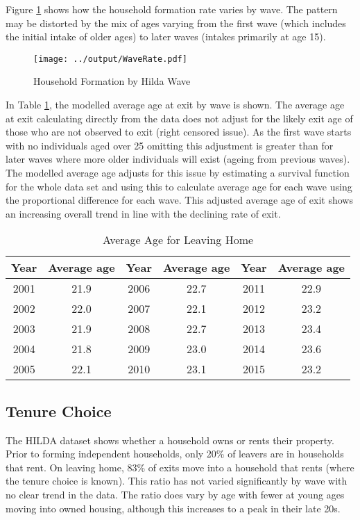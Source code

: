 \documentclass[12pt]{article}
\begin{document}
Figure \ref{ExitbyWave} shows how the household formation rate varies by wave. The pattern may be distorted by the mix of ages varying from the first wave (which includes the initial intake of older ages) to later waves (intakes primarily at age 15).

\begin{figure}[htpb]
  \caption{Household Formation by Hilda Wave}
  \label{ExitbyWave}
  \centering
  \texttt{[image: ../output/WaveRate.pdf]}
\end{figure}

In Table \ref{rate1}, the modelled average age at exit by wave is shown. The average age at exit calculating directly from the data does not adjust for the likely exit age of those who are not observed to exit (right censored issue). As the first wave starts with no individuals aged over 25 omitting this adjustment is greater than for later waves where more older individuals will exist (ageing from previous waves). The modelled average age adjusts for this issue by estimating a survival function for the whole data set and using this to calculate average age for each wave using the proportional difference for each wave. This adjusted average age of exit shows an increasing overall trend in line with the declining rate of exit.

\begin{table}[htpb]
  \centering
  \caption{Average Age for Leaving Home}
  \label{rate1}
\begin{tabular}{@{}cccccc@{}}
\toprule
Year & Average age & Year & Average age & Year & Average age\tabularnewline
\midrule
2001 & 21.9 & 2006 & 22.7 & 2011 & 22.9 \tabularnewline
2002 & 22.0 & 2007 & 22.1 & 2012 & 23.2 \tabularnewline
2003 & 21.9 & 2008 & 22.7 & 2013 & 23.4 \tabularnewline
2004 & 21.8 & 2009 & 23.0 & 2014 & 23.6 \tabularnewline
2005 & 22.1 & 2010 & 23.1 & 2015 & 23.2 \tabularnewline
\bottomrule
\end{tabular}
\end{table}


\subsection{Tenure Choice}
The HILDA dataset shows whether a household owns or rents their property. Prior to forming independent households, only 20\% of leavers are in households that rent.  On leaving home, 83\% of exits move into a household that rents (where the tenure choice is known). This ratio has not varied significantly by wave with no clear trend in the data. The ratio does vary by age with fewer at young ages moving into owned housing, although this increases to a peak in their late 20s.
\end{document}
